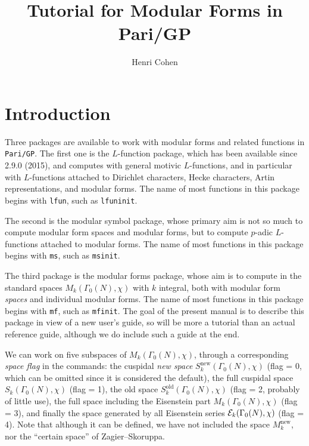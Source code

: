\documentclass[11pt]{article}
\newcommand{\G}{\Gamma}
\newcommand{\new}{\text{new}}
\def\kbd#1{{\tt #1}}
\begin{document}
\pagestyle{plain}

\title{Tutorial for Modular Forms in Pari/GP}
\author{Henri Cohen}

\maketitle

\smallskip

\section{Introduction}

Three packages are available to work with modular forms and related functions
in \kbd{Pari/GP}. The first one is the $L$-function package, which has been
available since 2.9.0 (2015), and computes with general motivic
$L$-functions, and in particular with $L$-functions attached to Dirichlet
characters, Hecke characters, Artin representations, and modular forms. The
name of most functions in this package begins with \kbd{lfun}, such as
\kbd{lfuninit}.

The second is the modular symbol package, whose primary aim
is not so much to compute modular form spaces and modular forms, but to
compute $p$-adic $L$-functions attached to modular forms. The name of most
functions in this package begins with \kbd{ms}, such as \kbd{msinit}.

The third package is the modular forms package, whose aim is to compute in
the standard spaces $M_k(\G_0(N),\chi)$ with $k$ integral, both with modular
form \emph{spaces} and individual modular forms. The name of most functions in
this package begins with \kbd{mf}, such as \kbd{mfinit}. The goal of the
present manual is to describe this package in view of a new user's guide, so
will be more a tutorial than an actual reference guide, although we do include
such a guide at the end.

\medskip

We can work on five subspaces of $M_k(\G_0(N),\chi)$, through a
corresponding \emph{space flag} in the commands: the cuspidal \emph{new
space} $S_k^{\new}(\G_0(N),\chi)$ (flag = 0, which can be omitted since it is
considered the default), the full cuspidal space $S_k(\G_0(N),\chi)$ (flag =
1), the old space $S_k^{\text{old}}(\G_0(N),\chi)$ (flag = 2, probably of
little use), the full space including the Eisenstein part $M_k(\G_0(N),\chi)$
(flag = 3), and finally the space generated by all Eisenstein series ${\cal
E}_k(\G_0(N),\chi)$ (flag = 4). Note that although it can be defined, we have
not included the space $M_k^{\new}$, nor the ``certain space'' of
Zagier--Skoruppa.
\end{document}
